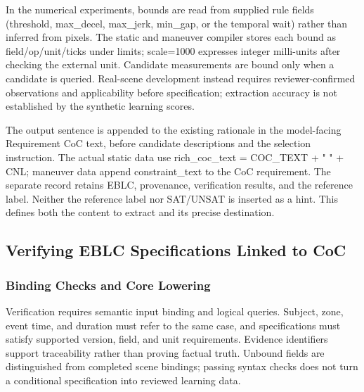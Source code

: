 \documentclass[nolineno]{ieeeaccess}
\begin{document}
In the numerical experiments, bounds are read from supplied rule fields ({\ttfamily{}\selectfont\footnotesize threshold}, {\ttfamily{}\selectfont\footnotesize max\_\allowbreak decel}, {\ttfamily{}\selectfont\footnotesize max\_\allowbreak jerk}, {\ttfamily{}\selectfont\footnotesize min\_\allowbreak gap}, or the temporal wait) rather than inferred from pixels. The static and maneuver compiler stores each bound as {\ttfamily{}\selectfont\footnotesize field/\allowbreak op/\allowbreak unit/\allowbreak ticks} under {\ttfamily{}\selectfont\footnotesize limits}; {\ttfamily{}\selectfont\footnotesize scale=1000} expresses integer milli-units after checking the external unit. Candidate measurements are bound only when a candidate is queried. Real-scene development instead requires reviewer-confirmed observations and applicability before specification; extraction accuracy is not established by the synthetic learning scores.\par

The output sentence is appended to the existing rationale in the model-facing {\ttfamily{}\selectfont\footnotesize Requirement CoC} text, before candidate descriptions and the selection instruction. The actual static data use {\ttfamily{}\selectfont\footnotesize rich\_\allowbreak coc\_\allowbreak text = COC\_\allowbreak TEXT + " " + CNL}; maneuver data append {\ttfamily{}\selectfont\footnotesize constraint\_\allowbreak text} to the CoC requirement. The separate record retains EBLC, provenance, verification results, and the reference label. Neither the reference label nor SAT/UNSAT is inserted as a hint. This defines both the content to extract and its precise destination.\par

\subsection{Verifying EBLC Specifications Linked to CoC}

\subsubsection{Binding Checks and Core Lowering}

Verification requires semantic input binding and logical queries. Subject, zone, event time, and duration must refer to the same case, and specifications must satisfy supported version, field, and unit requirements. Evidence identifiers support traceability rather than proving factual truth. Unbound fields are distinguished from completed scene bindings; passing syntax checks does not turn a conditional specification into reviewed learning data.\par
\end{document}
